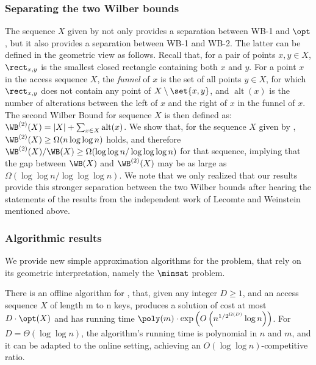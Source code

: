 \subsubsection{Separating the two Wilber bounds} The sequence $X$ given by  not only provides a separation between WB-1 and $\opt$, but it also provides a separation between WB-1 and WB-2. The latter can be defined in the geometric view as follows. Recall that, for a pair of points $x,y\in X$, $\rect_{x,y}$ is the smallest closed rectangle containing both $x$ and $y$. For a point $x$ in the access sequence $X$, the \emph{funnel} of $x$ is the set of all points $y\in X$, for which $\rect_{x,y}$ does not contain any point of $X\setminus\set{x,y}$, and $\operatorname{alt}(x)$ is the number of alterations between the left of $x$ and the right of $x$ in the {funnel} of $x$. The second Wilber Bound for sequence $X$ is then defined as: $\WB^{(2)}(X)=|X|+\sum_{x\in X}\operatorname{alt}(x)$. 
We show that, for the sequence $X$ given by , $\WB^{(2)}(X) \geq \Omega(n \log \log n)$ holds, and therefore $\WB^{(2)}(X)/\WB(X) \geq \Omega(\log \log n/ \log \log \log n)$ for that sequence, implying that  the gap between $\WB(X)$ and $\WB^{(2)}(X)$ may be as large as $\Omega(\log \log n/ \log \log \log n)$. 
We note that we only realized that our results provide this stronger separation between the two Wilber bounds after hearing the statements of the results from the independent work of Lecomte and Weinstein~\cite{LW19}  mentioned above.   



\subsubsection{Algorithmic results}

We provide new simple approximation algorithms for the problem, that rely on its geometric interpretation, namely the $\minsat$ problem.




\begin{theorem}
\label{thm:intro_alg} There  is
an offline algorithm for \minsat, that, given any integer $D\ge1$, and an access sequence $X$ of length m to n keys, produces a solution of cost at most $D\cdot\opt(X)$ and has running
time  $\poly(m) \cdot \exp\left(O\left (n^{1/2^{\Omega(D)}}\log n\right )\right )$.  
For 
$D=\Theta(\log\log n)$, the algorithm's running time is polynomial in $n$ and $m$, and it can be adapted to the online setting, achieving an $O(\log\log n)$-competitive ratio.
\end{theorem}


